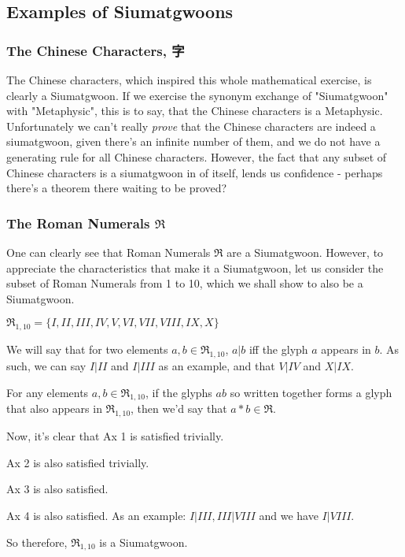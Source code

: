 \subsection{Examples of Siumatgwoons}

\subsubsection{The Chinese Characters, 字}

The Chinese characters, which inspired this whole mathematical exercise, is clearly a Siumatgwoon. If we exercise the synonym exchange of "Siumatgwoon" with "Metaphysic", this is to say, that the Chinese characters is a Metaphysic. Unfortunately we can't really \textit{prove} that the Chinese characters are indeed a siumatgwoon, given there's an infinite number of them, and we do not have a generating rule for all Chinese characters. However, the fact that any subset of Chinese characters is a siumatgwoon in of itself, lends us confidence - perhaps there's a theorem there waiting to be proved?

\subsubsection{The Roman Numerals $\mathfrak{R}$}

One can clearly see that Roman Numerals $\mathfrak{R}$ are a Siumatgwoon. However, to appreciate the characteristics that make it a Siumatgwoon, let us consider the subset of Roman Numerals from 1 to 10, which we shall show to also be a Siumatgwoon.

$\mathfrak{R}_{1,10} = \{I, II, III, IV, V, VI, VII, VIII, IX, X\}$

We will say that for two elements $a,b \in \mathfrak{R}_{1,10}$, $a|b$ iff the glyph $a$ appears in $b$. As such, we can say $I | II$ and $I|III$ as an example, and that $V|IV$ and $X|IX$. 

For any elements $a,b\in \mathfrak{R}_{1,10}$, if the glyphs $ab$ so written together forms a glyph that also appears in $\mathfrak{R}_{1,10}$, then we'd say that $a*b\in \mathfrak{R}$.

Now, it's clear that Ax 1 is satisfied trivially. 

Ax 2 is also satisfied trivially.

Ax 3 is also satisfied. 

Ax 4 is also satisfied. As an example: $I | III, III | VIII$ and we have $I|VIII$.

So therefore, $\mathfrak{R}_{1,10}$ is a Siumatgwoon. 

